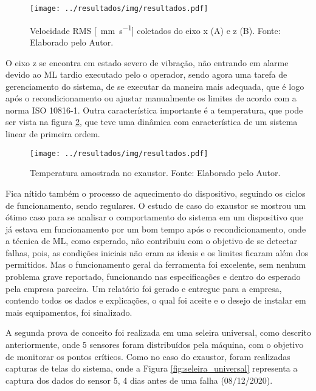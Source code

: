 \documentclass[a4paper]{ifacconf}
\begin{document}
\begin{figure}[h!]
  \begin{center}
      \texttt{[image: ../resultados/img/resultados.pdf]}
  \end{center}
  \caption{Velocidade RMS [\SI{}{\milli\metre\per\second}] coletados do eixo x (A) e z (B). Fonte: Elaborado pelo Autor.}
  \label{fig:exaustor_xz}
\end{figure}

O eixo z se encontra em estado severo de vibração, não entrando em alarme devido ao ML tardio executado
pelo o operador, sendo agora uma tarefa de gerenciamento do sistema, de se executar da maneira mais adequada, que é logo após o recondicionamento 
ou ajustar manualmente os limites de acordo com a norma ISO 10816-1. Outra característica importante é a temperatura, que pode ser vista na 
figura \ref{fig:exaustor_temperatura}, que teve uma dinâmica com característica de um sistema linear de primeira ordem.


\begin{figure}[h!]
  \begin{center}
      \texttt{[image: ../resultados/img/resultados.pdf]}
  \end{center}
  \caption{Temperatura amostrada no exaustor. Fonte: Elaborado pelo Autor.}
  \label{fig:exaustor_temperatura}
\end{figure}

Fica nítido também o processo de aquecimento do dispositivo, seguindo os ciclos de funcionamento, sendo regulares. O estudo de caso do 
exaustor se mostrou um ótimo caso para se analisar o comportamento do sistema em um dispositivo que já estava em funcionamento por um bom tempo 
após o recondicionamento, onde a técnica de ML, como esperado, não contribuiu com o objetivo de se detectar falhas, pois, as
condições iniciais não eram as ideais e os limites ficaram além dos permitidos. Mas o funcionamento geral da ferramenta foi excelente, sem nenhum
problema grave reportado, funcionando nas especificações e dentro do esperado pela empresa parceira. Um relatório foi gerado e entregue
para a empresa, contendo todos os dados e explicações, o qual foi aceite e o desejo de instalar em mais equipamentos, foi sinalizado.

A segunda prova de conceito foi realizada em uma seleira universal, como descrito anteriormente, onde 5 sensores foram distribuídos pela máquina, com o 
objetivo de monitorar os pontos críticos. Como no caso do exaustor, foram realizadas capturas de telas do sistema, onde a Figura
\ref{fig:seleira_universal} representa a captura dos dados do sensor 5, 4 dias antes de uma falha (08/12/2020). 
\end{document}
